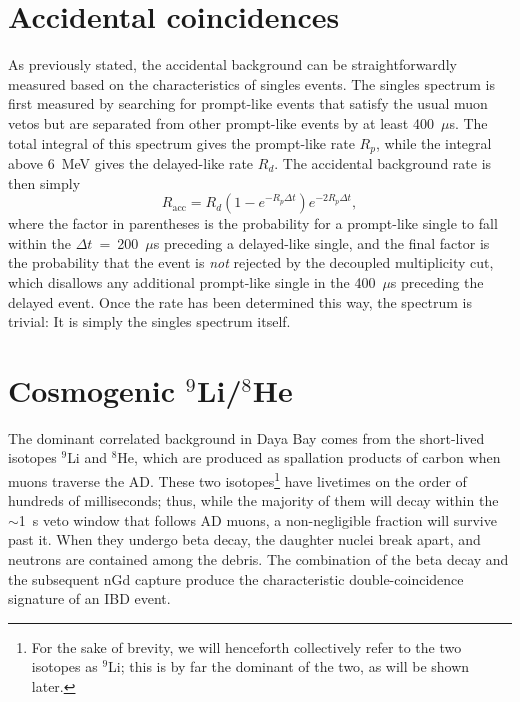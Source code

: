 \documentclass[../thesis.tex]{subfiles}
\begin{document}
\section{Accidental coincidences}
\label{chap:accbkg}

As previously stated, the accidental background can be straightforwardly
measured based on the characteristics of singles events. The singles spectrum is
first measured by searching for prompt-like events that satisfy the usual muon
vetos but are separated from other prompt-like events by at least
400~$\mu$s. The total integral of this spectrum gives the prompt-like rate
$R_p$, while the integral above 6~MeV gives the delayed-like rate $R_d$. The
accidental background rate is then simply
\[ R_\mathrm{acc} = R_d(1 - e^{-R_p\Delta t})e^{-2R_p\Delta t}, \] where the
factor in parentheses is the probability for a prompt-like single to fall within
the $\Delta t$~=~200~$\mu$s preceding a delayed-like single, and the final
factor is the probability that the event is \emph{not} rejected by the decoupled
multiplicity cut, which disallows any additional prompt-like single in the
400~$\mu$s preceding the delayed event. Once the rate has been determined this
way, the spectrum is trivial: It is simply the singles spectrum itself.

\begin{comment}
  Mention IHEP's cross-check, and the additional uncertainty stemming from the
  difference between it and the nominal result?
\end{comment}

\section{Cosmogenic $^9$Li/$^8$He}

\newcommand\linine{$^9$Li}

The dominant correlated background in Daya Bay comes from the short-lived
isotopes $^9$Li and $^8$He, which are produced as spallation products of carbon
when muons traverse the AD. These two isotopes\footnote{For the sake of brevity,
  we will henceforth collectively refer to the two isotopes as \linine; this is
  by far the dominant of the two, as will be shown later.} have livetimes on the
order of hundreds of milliseconds; thus, while the majority of them will decay
within the $\sim$1~s veto window that follows AD muons, a non-negligible
fraction will survive past it. When they undergo beta decay, the daughter nuclei
break apart, and neutrons are contained among the debris. The combination of the
beta decay and the subsequent nGd capture produce the characteristic
double-coincidence signature of an IBD event.
\end{document}
